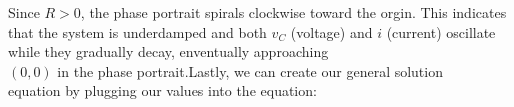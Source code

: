 \documentclass[preview]{standalone}
\begin{document}
\begin{center}
\raggedright
                    Since $R > 0$, the phase portrait spirals clockwise toward the orgin. This indicates
                    that the system is underdamped and both $v_C$ (voltage) and $i$ (current) oscillate 
                    while they gradually decay, enventually approaching \\
                    $(0,0)$ in the phase portrait.Lastly, we can create our general solution \\
                    equation by plugging our values into the equation:
\end{center}
\end{document}
